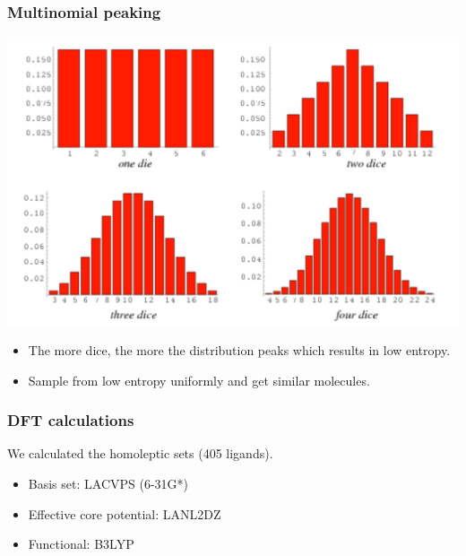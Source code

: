 \documentclass[xcolor=dvipsnames]{beamer}
\begin{document}
\begin{frame}
\frametitle{Multinomial peaking}
\includegraphics[width=0.6\linewidth]{img/dice.png}
\centering
\begin{itemize}
\item The more dice, the more the distribution peaks which results in low entropy.  
\item Sample from low entropy uniformly and get similar molecules.
\end{itemize}
\end{frame}



\begin{frame}
\frametitle{DFT calculations}
We calculated the homoleptic sets (405 ligands).
\begin{itemize}
\item Basis set: LACVPS (6-31G*)
\item Effective core potential: LANL2DZ
\item Functional: B3LYP
\end{itemize}
\end{frame}
\end{document}
